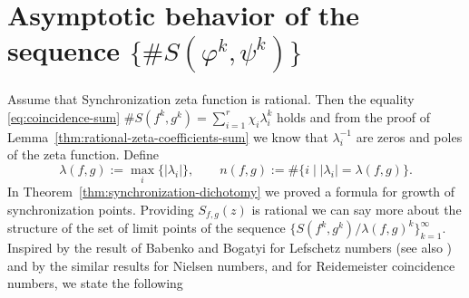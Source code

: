 \documentclass[oneside]{amsart}
\begin{document}
\vspace{1cm}

\section{Asymptotic behavior of the sequence $\{\# S(\varphi^k, \psi^k)\}$}  \label{sec:asymptotic}


Assume that Synchronization zeta function is rational.
Then the equality \eqref{eq:coincidence-sum}  $\# S(f^k, g^k) = \sum_{i=1}^{r} \chi_i \lambda_i^k$ holds
and from the proof of Lemma~\ref{thm:rational-zeta-coefficients-sum} we know
that $\lambda_i^{-1}$ are zeros and poles of the zeta function.
Define
\begin{equation*}
  \lambda(f,g) := \max_i \{|\lambda_i|\}, \qquad n(f,g) := \#\{ i \mid |\lambda_i| = \lambda(f,g) \}.
\end{equation*}
In Theorem~\ref{thm:synchronization-dichotomy} we proved a formula for growth
of synchronization points.
Providing $S_{f,g}(z)$ is rational we can say more about the structure of the set
of limit points of the sequence $\{S(f^k, g^k) / \lambda(f,g)^k\}_{k=1}^\infty$.
Inspired by the result of Babenko and Bogatyi \cite[Theorem 2.6]{BaBo} for Lefschetz numbers (see also \cite[Theorem~3.1.53]{JezMar})
and by the similar results \cite[Theorem 4.1]{FelsLee} for Nielsen numbers,
and \cite[Theorem~8.4]{FelsSlo24} for Reidemeister coincidence numbers,
we state the following
\end{document}
